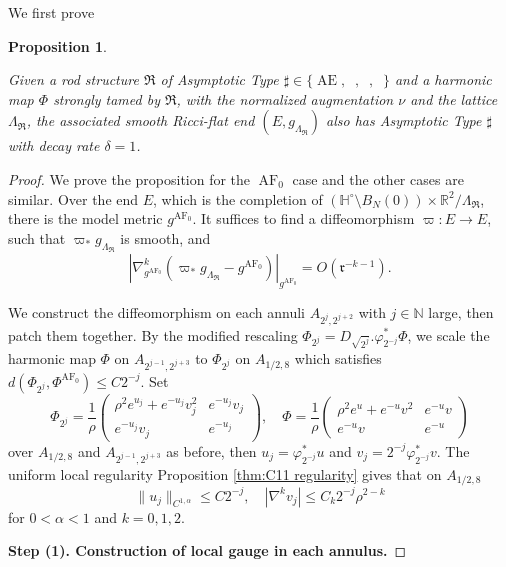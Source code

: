 \documentclass[a4paper,11pt]{amsart}
\newtheorem{proposition}[theorem]{Proposition}
\theoremstyle{definition}
\numberwithin{equation}{section}
\newcommand{\mR} {\mathfrak R}
\DeclareMathOperator{\Ae}{AE}
\DeclareMathOperator{\ALFp}{ALF^+}
\DeclareMathOperator{\ALFm}{ALF^{--}}
\DeclareMathOperator{\AF}{AF}
\DeclareMathOperator{\AFa}{AF_\beta}
\begin{document}
We first prove 
\begin{proposition}\label{prop:appendix 1}

    
    Given a rod structure $\mR$ of  Asymptotic Type  $\sharp\in\{\Ae,\ALFm,\ALFp, \AFa\}$ and a harmonic map $\Phi$ strongly tamed by $\mR$, with the normalized augmentation $\nu$ and the lattice $\Lambda_\mR$, the associated smooth Ricci-flat end $(E,g_{\Lambda_\mR})$ also has  Asymptotic Type  $\sharp$ with decay rate $\delta=1$.
\end{proposition}
\begin{proof}
    We prove the proposition for the $\AF_0$ case and the other cases are similar. Over the end $E$, which is the completion of $(\mathbb{H}^\circ\setminus B_N(0))\times\mathbb{R}^2/\Lambda_\mR$, there is the model metric $g^{\AF_0}$. It suffices to find a diffeomorphism $\varpi:E\to E$, such that $\varpi_*g_{\Lambda_\mR}$ is smooth, and 
    $$|\nabla_{g^{\AF_0}}^k(\varpi_*g_{\Lambda_{\mR}}-g^{\AF_0})|_{g^{\AF_0}}=O(\mathfrak{r}^{-k-1}).$$

    We construct the diffeomorphism on each annuli $A_{2^{j},2^{j+2}}$ with $j\in\mathbb{N}$ large, then patch them together. By the modified rescaling $\Phi_{2^j}=D_{\sqrt{2^j}}.\varphi_{2^{-j}}^*\Phi$, we scale the harmonic map $\Phi$ on $A_{2^{j-1},2^{j+3}}$ to $\Phi_{2^j}$ on $A_{1/2,8}$ which satisfies $d(\Phi_{2^j},\Phi^{\AF_0})\leq C2^{-j}$. Set
    $$\Phi_{2^j}=\frac{1}{\rho}\left(\begin{matrix}
        \rho^2e^{u_j}+e^{-u_j}v_j^2 & e^{-u_j}v_j \\ e^{-u_j}v_j & e^{-u_j} 
    \end{matrix}\right),\quad \Phi=\frac{1}{\rho}\left(\begin{matrix}
        \rho^2e^{u}+e^{-u}v^2 & e^{-u}v \\ e^{-u}v & e^{-u} 
    \end{matrix}\right)$$
    over $A_{1/2,8}$ and $A_{2^{j-1},2^{j+3}}$ as before, then $u_j=\varphi_{2^{-j}}^*u$ and $v_j=2^{-j}\varphi_{2^{-j}}^*v$. The uniform local regularity Proposition \ref{thm:C11 regularity} gives that on $A_{1/2,8}$
    \begin{equation}\label{eq:C1a scale to A12 appendix}
        \|u_j\|_{C^{1,\alpha}}\leq C2^{-j},\quad |\nabla^kv_j|\leq C_k2^{-j}\rho^{2-k}
    \end{equation}
    for $0<\alpha<1$ and $k=0,1,2$. 


    \vspace{10pt}
    \noindent\textbf{Step (1). Construction of local gauge in each annulus.}
    \vspace{10pt}



\end{proof}
\end{document}
